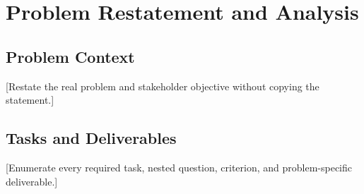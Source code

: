 \section{Problem Restatement and Analysis}
\subsection{Problem Context}
[Restate the real problem and stakeholder objective without copying the statement.]
\subsection{Tasks and Deliverables}
[Enumerate every required task, nested question, criterion, and problem-specific deliverable.]
